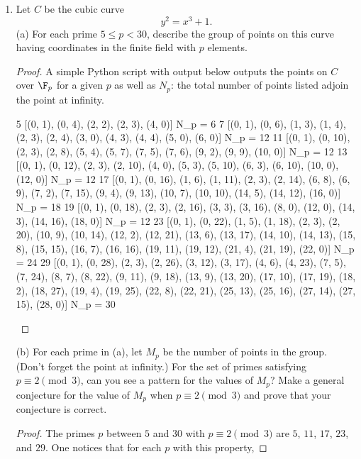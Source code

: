\documentclass[11pt, oneside]{article}
\begin{document}
\begin{enumerate}
\begin{proof}
\begin{align*}
\wp(\omega_1/2) - \wp(-\omega_1/2) &= a\\
\wp(\omega_1/2) - \wp(\omega_1/2) &= a\\
0&=a.
\end{align*}
So $\wp$ is doubly periodic.
\end{proof}
\item Let $C$ be the cubic curve 
$$
y^2 = x^3+1.
$$
(a) For each prime $5\le  p < 30$, describe the group of points on this curve having coordinates in the finite field with $p$ elements.
\begin{proof}
A simple Python script with output below outputs the points on $C$ over $\F_p$ for a given $p$ as well as $N_p$: the total number of points listed adjoin the point at infinity.
\footnotesize
\begin{spverbatim}
5
[(0, 1), (0, 4), (2, 2), (2, 3), (4, 0)] 
N_p = 6
7
[(0, 1), (0, 6), (1, 3), (1, 4), (2, 3), (2, 4), (3, 0), (4, 3), (4, 4), (5, 0), (6, 0)] 
N_p = 12
11
[(0, 1), (0, 10), (2, 3), (2, 8), (5, 4), (5, 7), (7, 5), (7, 6), (9, 2), (9, 9), (10, 0)] 
N_p = 12
13
[(0, 1), (0, 12), (2, 3), (2, 10), (4, 0), (5, 3), (5, 10), (6, 3), (6, 10), (10, 0), (12, 0)] 
N_p = 12
17
[(0, 1), (0, 16), (1, 6), (1, 11), (2, 3), (2, 14), (6, 8), (6, 9), (7, 2), (7, 15), (9, 4), (9, 13), (10, 7), (10, 10), (14, 5), (14, 12), (16, 0)] 
N_p = 18
19
[(0, 1), (0, 18), (2, 3), (2, 16), (3, 3), (3, 16), (8, 0), (12, 0), (14, 3), (14, 16), (18, 0)] 
N_p = 12
23
[(0, 1), (0, 22), (1, 5), (1, 18), (2, 3), (2, 20), (10, 9), (10, 14), (12, 2), (12, 21), (13, 6), (13, 17), (14, 10), (14, 13), (15, 8), (15, 15), (16, 7), (16, 16), (19, 11), (19, 12), (21, 4), (21, 19), (22, 0)] 
N_p = 24
29
[(0, 1), (0, 28), (2, 3), (2, 26), (3, 12), (3, 17), (4, 6), (4, 23), (7, 5), (7, 24), (8, 7), (8, 22), (9, 11), (9, 18), (13, 9), (13, 20), (17, 10), (17, 19), (18, 2), (18, 27), (19, 4), (19, 25), (22, 8), (22, 21), (25, 13), (25, 16), (27, 14), (27, 15), (28, 0)] 
N_p = 30
\end{spverbatim}
\normalsize
\end{proof}
(b) For each prime in (a), let $M_p$ be the number of points in the group. (Don't forget the point at infinity.) For the set of primes satisfying $p\equiv 2\pmod 3$, can you see a pattern for the values of $M_p$? Make a general conjecture for the value of $M_p$ when $p\equiv 2\pmod 3$ and prove that your conjecture is correct.
\begin{proof}
The primes $p$ between $5$ and $30$ with $p\equiv 2\pmod 3$ are $5$, $11$, $17$, $23$, and $29$. One notices that for each $p$ with this property, 

\end{proof}
\end{enumerate}
\end{document}
